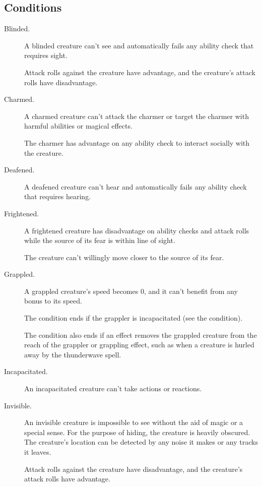 \subsection{Conditions}

\begin{description}
    \item[Blinded.] A blinded creature can’t see and automatically fails any ability check that requires sight. 

    Attack rolls against the creature have advantage, and the creature’s attack rolls have disadvantage.

    \item[Charmed.] A charmed creature can’t attack the charmer or target the charmer with harmful abilities or magical effects.
    
    The charmer has advantage on any ability check to interact socially with the creature.

    \item[Deafened.] A deafened creature can’t hear and automatically fails any ability check that requires hearing.

    \item[Frightened.] A frightened creature has disadvantage on ability checks and attack rolls while the source of its fear is within line of sight.

    The creature can’t willingly move closer to the source of its fear.

    \item[Grappled.] A grappled creature’s speed becomes 0, and it can’t benefit from any bonus to its speed.

    The condition ends if the grappler is incapacitated (see the condition).

    The condition also ends if an effect removes the grappled creature from the reach of the grappler or grappling effect, such as when a creature is hurled away by the thunderwave spell.

    \item[Incapacitated.] An incapacitated creature can’t take actions or reactions.

    \item[Invisible.] An invisible creature is impossible to see without the aid of magic or a special sense. For the purpose of hiding, the creature is heavily obscured. The creature’s location can be detected by any noise it makes or any tracks it leaves.

    Attack rolls against the creature have disadvantage, and the creature’s attack rolls have advantage.


\end{description}
